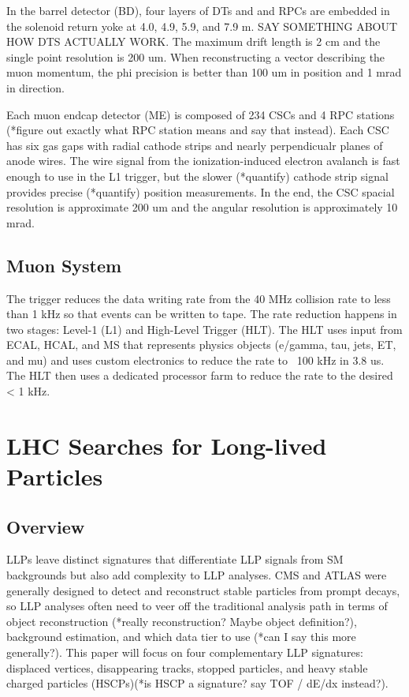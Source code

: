 \documentclass[12pt]{article}
\begin{document}
    In the barrel detector (BD), four layers of DTs and and RPCs are embedded in the solenoid return yoke at 4.0, 4.9, 5.9, and 7.9 m. SAY SOMETHING ABOUT HOW DTS ACTUALLY WORK. The maximum drift length is 2 cm and the single point resolution is 200 um. When reconstructing a vector describing the muon momentum, the phi precision is better than 100 um in position and 1 mrad in direction. 

    Each muon endcap detector (ME) is composed of 234 CSCs and 4 RPC stations (*figure out exactly what RPC station means and say that instead). Each CSC has six gas gaps with radial cathode strips and nearly perpendicualr planes of anode wires. The wire signal from the ionization-induced electron avalanch is fast enough to use in the L1 trigger, but the slower (*quantify) cathode strip signal provides precise (*quantify) position measurements. In the end, the CSC spacial resolution is approximate 200 um and the angular resolution is approximately 10 mrad.

\subsection{Muon System}
    The trigger reduces the data writing rate from the 40 MHz collision rate to less than 1 kHz so that events can be written to tape. The rate reduction happens in two stages: Level-1 (L1) and High-Level Trigger (HLT). The HLT uses input from ECAL, HCAL, and MS that represents physics objects (e/gamma, tau, jets, ET, and mu) and uses custom electronics to reduce the rate to ~100 kHz in 3.8 us. The HLT then uses a dedicated processor farm to reduce the rate to the desired < 1 kHz.

\section{LHC Searches for Long-lived Particles}
\subsection{Overview}
    LLPs leave distinct signatures that differentiate LLP signals from SM backgrounds but also add complexity to LLP analyses. CMS and ATLAS were generally designed to detect and reconstruct stable particles from prompt decays, so LLP analyses often need to veer off the traditional analysis path in terms of object reconstruction (*really reconstruction? Maybe object definition?), background estimation, and which data tier to use (*can I say this more generally?). This paper will focus on four complementary LLP signatures: displaced vertices, disappearing tracks, stopped particles, and heavy stable charged particles (HSCPs)(*is HSCP a signature? say TOF / dE/dx instead?).
\end{document}
